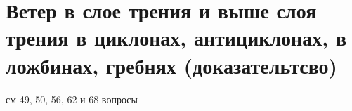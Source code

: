 
\section{Ветер в слое трения и выше слоя трения в циклонах, антициклонах, в ложбинах, гребнях (доказательтсво)}
см 49, 50, 56, 62 и 68 вопросы